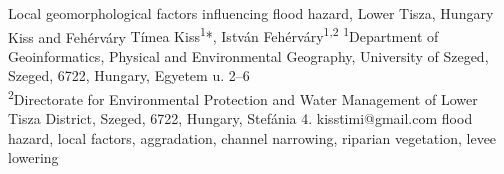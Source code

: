 \abstract
{Local geomorphological factors influencing flood hazard, Lower Tisza, Hungary} 
{Kiss and Fehérváry} 
{Tímea Kiss\textsuperscript{1}*, István Fehérváry\textsuperscript{1,2}} 
{\TLtag} 
{
\textsuperscript{1}Department of Geoinformatics, Physical and Environmental Geography, University of Szeged, Szeged, 6722, Hungary, Egyetem u. 2–6\\
\textsuperscript{2}Directorate for Environmental Protection and Water Management of Lower Tisza District,
	Szeged, 6722, Hungary, Stefánia 4.
}
{kisstimi@gmail.com}  %
{flood hazard, local factors, aggradation, channel narrowing, riparian vegetation, levee lowering}
